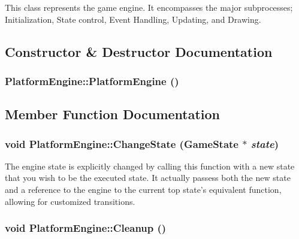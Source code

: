 This class represents the game engine. It encompasses the major subprocesses; Initialization, State control, Event Handling, Updating, and Drawing. 

\subsection{Constructor \& Destructor Documentation}
\hypertarget{class_platform_engine_9d45e2da5a9b7e52d8c5636f70068e11}{
\subsubsection[{PlatformEngine}]{\setlength{\rightskip}{0pt plus 5cm}PlatformEngine::PlatformEngine ()}}
\label{class_platform_engine_9d45e2da5a9b7e52d8c5636f70068e11}




\subsection{Member Function Documentation}
\hypertarget{class_platform_engine_d2b335545c9ab6bce7be7c014bc8c528}{
\subsubsection[{ChangeState}]{\setlength{\rightskip}{0pt plus 5cm}void PlatformEngine::ChangeState ({\bf GameState} $\ast$ {\em state})}}
\label{class_platform_engine_d2b335545c9ab6bce7be7c014bc8c528}


The engine state is explicitly changed by calling this function with a new state that you wish to be the executed state. It actually passess both the new state and a reference to the engine to the current top state's equivalent function, allowing for customized transitions. \hypertarget{class_platform_engine_361b54312d9ec2fa842cd982f67100f9}{
\subsubsection[{Cleanup}]{\setlength{\rightskip}{0pt plus 5cm}void PlatformEngine::Cleanup ()}}
\label{class_platform_engine_361b54312d9ec2fa842cd982f67100f9}


